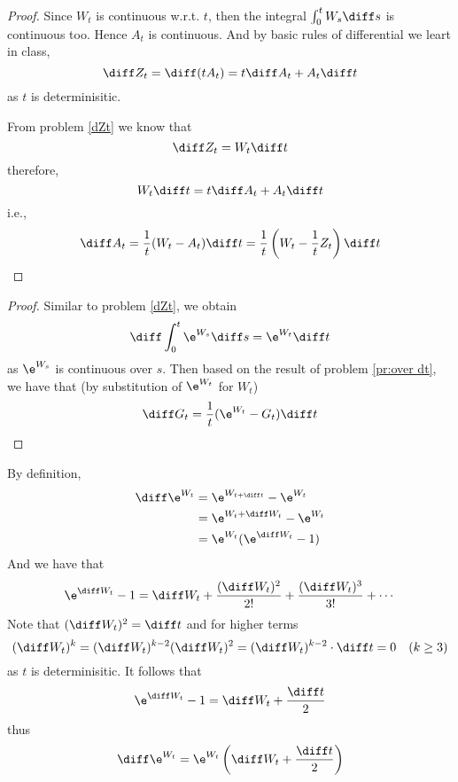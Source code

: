     \problem
    \label{pr:over dt}
    \begin{proof}
        Since $W_t$ is continuous w.r.t. $t$, then the
        integral $\int_0^tW_s\diff s$ is continuous too.
        Hence $A_t$ is continuous. And by basic rules of
        differential we leart in class,
        \[\diff Z_t=\diff(tA_t)=t\diff A_t+A_t\diff t\]
        as $t$ is determinisitic.

        From problem \ref{dZt} we know that
        \[\diff Z_t=W_t\diff t\]
        therefore,
        \[W_t\diff t=t\diff A_t+A_t\diff t\]
        i.e.,
        \[\diff A_t=\frac{1}{t}(W_t-A_t)\diff t
        =\frac{1}{t}\left(W_t-\frac{1}{t}Z_t\right)\diff t\]
    \end{proof}

    \problem
    \begin{proof}
        Similar to problem \ref{dZt},
        we obtain
        \[\diff\int_0^t\e^{W_s}\diff s=\e^{W_t}\diff t\]
        as $\e^{W_s}$ is continuous over $s$.
        Then based on the result of problem \ref{pr:over dt},
        we have that (by substitution of $\e^{W_t}$ for $W_t$)
        \[\diff G_t=\frac1t(\e^{W_t}-G_t)\diff t\]
    \end{proof}

    \problem
    By definition,
    \[\begin{aligned}
        \diff\e^{W_t}&=\e^{W_{t+\diff t}}-\e^{W_t}\\
        &=\e^{W_t+\diff W_t}-\e^{W_t}\\
        &=\e^{W_t}(\e^{\diff W_t}-1)
    \end{aligned}\]
    And we have that
    \[\e^{\diff W_t}-1=\diff W_t+\frac{(\diff W_t)^2}{2!}
    +\frac{(\diff W_t)^3}{3!}+\cdots\]
    Note that $(\diff W_t)^2=\diff t$ and for higher terms
    \begin{equation}
        \label{eq:high term 0}
        (\diff W_t)^k=(\diff W_t)^{k-2}(\diff W_t)^2
        =(\diff W_t)^{k-2}\cdot\diff t=0\quad(k\geq 3)
    \end{equation}
    as $t$ is determinisitic. It follows that
    \[\e^{\diff W_t}-1=\diff W_t+\frac{\diff t}{2}\]
    thus
    \[\diff\e^{W_t}=\e^{W_t}\left(\diff W_t+\frac{\diff t}{2}\right)\]


